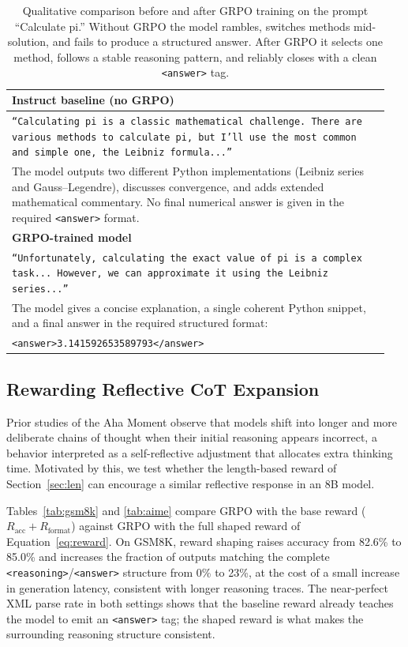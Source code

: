 \documentclass{article}
\begin{document}
\begin{table}[t]
\centering
\begin{tabular}{p{0.95\linewidth}}
\toprule
\textbf{Instruct baseline (no GRPO)} \\
\midrule
\texttt{``Calculating pi is a classic mathematical challenge. There are various methods to calculate pi, but I'll use the most common and simple one, the Leibniz formula...''} \\
The model outputs two different Python implementations (Leibniz series and Gauss--Legendre), discusses convergence, and adds extended mathematical commentary. No final numerical answer is given in the required \texttt{<answer>} format. \\
\midrule
\textbf{GRPO-trained model} \\
\midrule
\texttt{``Unfortunately, calculating the exact value of pi is a complex task... However, we can approximate it using the Leibniz series...''} \\
The model gives a concise explanation, a single coherent Python snippet, and a final answer in the required structured format: \\
\quad\texttt{<answer>3.141592653589793</answer>} \\
\bottomrule
\end{tabular}
\medskip
\caption{Qualitative comparison before and after GRPO training on the prompt ``Calculate pi.'' Without GRPO the model rambles, switches methods mid-solution, and fails to produce a structured answer. After GRPO it selects one method, follows a stable reasoning pattern, and reliably closes with a clean \texttt{<answer>} tag.}
\label{tab:pi}
\end{table}

\subsection{Rewarding Reflective CoT Expansion}

Prior studies of the Aha Moment observe that models shift into longer and more deliberate chains of thought when their initial reasoning appears incorrect, a behavior interpreted as a self-reflective adjustment that allocates extra thinking time. Motivated by this, we test whether the length-based reward of Section~\ref{sec:len} can encourage a similar reflective response in an 8B model.

Tables~\ref{tab:gsm8k} and \ref{tab:aime} compare GRPO with the base reward ($R_{\text{acc}} + R_{\text{format}}$) against GRPO with the full shaped reward of Equation~\ref{eq:reward}. On GSM8K, reward shaping raises accuracy from 82.6\% to 85.0\% and increases the fraction of outputs matching the complete \texttt{<reasoning>}/\texttt{<answer>} structure from 0\% to 23\%, at the cost of a small increase in generation latency, consistent with longer reasoning traces. The near-perfect XML parse rate in both settings shows that the baseline reward already teaches the model to emit an \texttt{<answer>} tag; the shaped reward is what makes the surrounding reasoning structure consistent.
\end{document}
